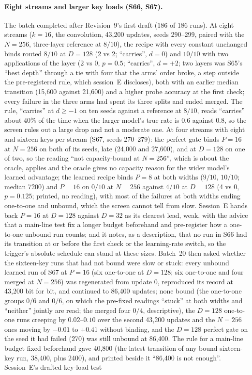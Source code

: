 \documentclass[11pt]{article}
\begin{document}
\paragraph{Eight streams and larger key loads (S66, S67).} The batch completed after Revision~9's first draft (186 of 186 runs). At eight streams ($k = 16$, the convolution, 43{,}200 updates, seeds 290--299, paired with the $N = 256$, three-layer reference at $8/10$), the recipe with every constant unchanged binds routed $8/10$ at $D = 128$ (2 vs 2; ``carries'', $d = 0$) and $10/10$ with two applications of the layer (2 vs 0, $p = 0.5$; ``carries'', $d = +2$; two layers was S65's ``best depth'' through a tie with four that the arms' order broke, a step outside the pre-registered rule, which session~E discloses), both with an earlier median transition (15{,}600 against 21{,}600) and a higher probe accuracy at the first check; every failure in the three arms had spent its three splits and ended merged. The rule, ``carries'' at $d \geq -1$ on ten seeds against a reference at $8/10$, reads ``carries'' about $40\%$ of the time when the larger model's true rate is $0.6$ against $0.8$, so the screen rules out a large drop and not a moderate one. At four streams with eight and sixteen keys per stream (S67, seeds 270--279): the perfect gate binds $P = 16$ at $N = 256$ on both of its seeds, late (24{,}000 and 27{,}600), and at $D = 128$ on one of two, so the reading ``not capacity-bound at $N = 256$'', which is about the oracle, applies and the oracle gives no capacity reason for the wider model's learned advantage; the learned recipe binds $P = 8$ at both widths ($9/10$, $10/10$; median 7200) and $P = 16$ on $0/10$ at $N = 256$ against $4/10$ at $D = 128$ (4 vs 0, $p = 0.125$; printed, no reading), with most of the failures at both widths ending one-to-one and unbound, which the screen cannot tell from slow. Session~E hands back $P = 16$ at $D = 128$ against $D = 32$ as its clearest lead, weak, with the advice that a main-line test fix a longer budget beforehand and pre-register how a one-to-one unbound run counts; and it notes, as a description, that no run in S66 had its transition at or before the first check or the learning-rate switch, so the trigger's absolute schedule can stand at these sizes. Batch~20 then asked whether the sixteen-key runs that had not bound were slow or stuck: every unbound learned run of S67 at $P = 16$ (six one-to-one at $D = 128$; six one-to-one and four merged at $N = 256$) was regenerated from update 0, reproduced its record at 43{,}200 bit for bit, and continued to 86{,}400 updates; none bound (the one-to-one groups $0/6$ and $0/6$, on which the pre-fixed readings ``stuck'' at both widths and ``neither'' jointly are read; the merged four $0/4$, descriptive), the $D = 128$ one-to-one runs creeping by $0.02$--$0.10$ over the second 43{,}200 updates and the $N = 256$ ones moving by $-0.01$ to $+0.41$ without binding, and the $D = 128$ perfect gate on the seed it had failed (270) was still unbound at 86{,}400. The rule for a main-line budget fixed beforehand gave 40{,}800 (the latest transition of any bound sixteen-key run, 38{,}400, plus 2400), and printed beside it ``86{,}400 is not enough''. Session~E's drafted key-load test 
\end{document}
